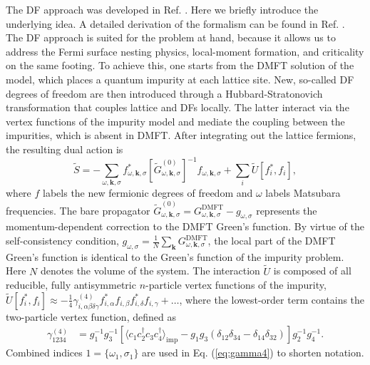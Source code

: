 \documentclass[aps,prb,twocolumn,amsmath,notitlepage,floatfix,footinbib,superscriptaddress,showpacs, showkeys]{revtex4-1}
\newcommand{\kay}{\mathbf{k}}
\newcommand{\str}{^{*}}
\begin{document}
The DF approach was developed in Ref. . 
Here we briefly introduce the underlying idea. A detailed derivation of the formalism can be found in Ref. . 
The DF approach is suited for the problem at hand, because it allows us to address the Fermi surface nesting physics, local-moment formation, and criticality on the same footing.
To achieve this, one starts from the DMFT solution of the model, which places a quantum impurity at each lattice site. New, so-called DF degrees of freedom are then introduced through a Hubbard-Stratonovich transformation that couples lattice and DFs locally. The latter interact via the vertex functions of the impurity model and mediate the coupling between the impurities, which is absent in DMFT.
After integrating out the lattice fermions, the resulting dual action is
\begin{equation}\label{eq:dual_action}
\tilde{S} =-\sum_{\omega,\kay,\sigma} f^{*}_{\omega,\kay,\sigma}\left[\tilde{G}^{(0)}_{\omega,\kay,\sigma}\right]^{-1}f_{\omega,\kay,\sigma} + \sum_i \tilde{U}[f^{*}_i,f_i],
\end{equation}
where $f$ labels the new fermionic degrees of freedom and $\omega$ labels Matsubara frequencies. The bare propagator $\tilde{G}^{(0)}_{\omega,\kay,\sigma} =G^{\mathrm{DMFT}}_{\omega, \kay,\sigma} - g_{\omega,\sigma}$ represents the momentum-dependent correction to the DMFT Green's function. By virtue of the self-consistency condition,  $g_{\omega,\sigma} = \frac{1}{N} \sum_{\kay} G^{\mathrm{DMFT}}_{\omega, \kay,\sigma}$, the local part of the DMFT Green's function is identical to the Green's function of the impurity problem. Here $N$ denotes the volume of the system.
The interaction $\tilde U$ is composed of all reducible, fully antisymmetric $n$-particle vertex functions of the impurity,
$\tilde U[f_i\str,f_i] \approx -\frac{1}{4}\gamma^{(4)}_{i,\alpha\beta\delta\gamma}f\str_{i,\alpha}f_{i,\beta}f\str_{i,\delta}f_{i,\gamma} + \hdots$, where the lowest-order term contains the two-particle vertex function, defined as
\begin{equation}\label{eq:gamma4}\begin{aligned}
\gamma^{(4)}_{1234}  & = g^{-1}_{1} g^{-1}_{3} \left[ \langle c_{1}c_{2}^\dagger c_{3}c_{4}^\dagger \rangle_{\text{imp}} - g_{1}g_{3} (\delta_{12}\delta_{34} - \delta_{14}\delta_{32}) \right] g_{2}^{-1} g_{4}^{-1}.
\end{aligned}
\end{equation}
Combined indices $1=\{\omega_1,\sigma_1\}$ are used in Eq. (\ref{eq:gamma4}) to shorten notation. 
\end{document}
